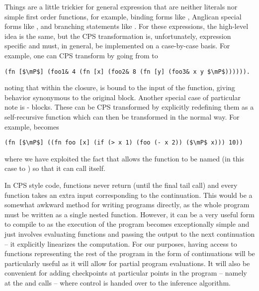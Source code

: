 Things are a little
trickier for general expression that are neither literals nor simple first order functions, for example,
binding forms like , Anglican special forms like \sample, and branching statements like .
For these expressions, the high-level idea is the same, but the CPS transformation is, unfortunately, 
expression specific and must, in general, be implemented on a case-by-case basis.  
For example, one can CPS transform  by going from
 to
 \begin{lstlisting}[basicstyle=\ttfamily\small,frame=none]
 (fn [$\mP$] (foo1& 4 (fn [x] (foo2& 8 (fn [y] (foo3& x y $\mP$)))))).
 \end{lstlisting}\vspace{-8pt}
noting that within the  closure,  is bound to the input of the 
function, giving behavior synonymous to the original
 block.  
Another special case of particular note is - blocks.  These can be CPS
transformed by explicitly redefining them as a self-recursive function which can then
be transformed in the normal way.  For example,
becomes
\begin{lstlisting}[basicstyle=\ttfamily\small,frame=none]
 (fn [$\mP$] ((fn foo [x] (if (> x 1) (foo (- x 2)) ($\mP$ x))) 10))
 \end{lstlisting}\vspace{-8pt}
where we have exploited the fact that  allows the function to be named (in this case to
) so that it can call itself.
 
In CPS style code, functions never return (until the final tail call) and every function takes an
extra input corresponding to the continuation.  This would be a somewhat awkward method for
writing programs directly, as the whole program must be written as a single nested function.  However,
it can be a very useful form to compile to as the execution of the program becomes
exceptionally simple and just involves evaluating functions and passing the output to the
next continuation -- it explicitly linearizes the computation.  For our purposes, having access
to functions representing the rest of the program in the form of continuations will be
particularly useful as it will allow for partial program evaluations.  It will also be convenient
for adding checkpoints at particular points in the program -- namely at the \sample and
\observe calls -- where control is handed over to the inference algorithm.

